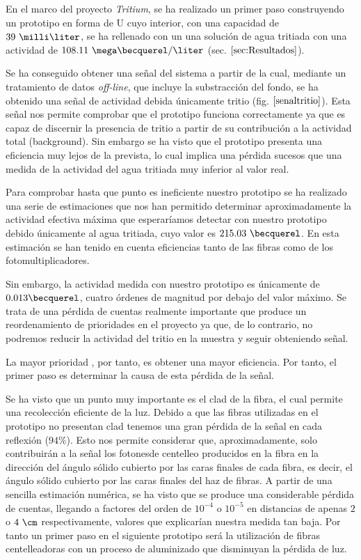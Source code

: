 En el marco del proyecto \textit{Tritium}, se ha realizado un primer paso construyendo un prototipo en forma de U cuyo interior, con una capacidad de $39~\milli\liter$, se ha rellenado con un una solución de agua tritiada con una actividad de $108.11~\mega\becquerel/\liter$ (sec. $\ref{sec:Resultados}$).

Se ha conseguido obtener una señal del sistema a partir de la cual, mediante un tratamiento de datos \textit{off-line}, que incluye la substracción del fondo, se ha obtenido una señal de actividad debida únicamente tritio (fig. $\ref{senaltritio}$). Esta señal nos permite comprobar que el prototipo funciona correctamente ya que es capaz de discernir la presencia de tritio a partir de su contribución a la actividad total (background).
Sin embargo se ha visto que el prototipo presenta una eficiencia muy lejos de la prevista, lo cual implica una pérdida sucesos que una medida de la actividad del agua tritiada muy inferior al valor real. 

Para comprobar hasta que punto es ineficiente nuestro prototipo se ha realizado una serie de estimaciones que nos han permitido determinar aproximadamente la actividad efectiva máxima que esperaríamos detectar con nuestro prototipo debido únicamente al agua tritiada, cuyo valor es $215.03~\becquerel$. En esta estimación se han tenido en cuenta eficiencias tanto de las fibras como de los fotomultiplicadores. 

Sin embargo, la actividad medida con nuestro prototipo es únicamente de $0.013\becquerel$, cuatro órdenes de magnitud por debajo del valor máximo. Se trata de una pérdida de cuentas realmente importante que produce un reordenamiento de prioridades en el proyecto ya que, de lo contrario, no podremos reducir la actividad del tritio en la muestra y seguir obteniendo señal. 

La mayor prioridad , por tanto, es obtener una mayor eficiencia. Por tanto, el primer paso es determinar la causa de  esta pérdida de la señal. 

Se ha visto que un punto muy importante es el clad de la fibra, el cual permite una recolección eficiente de la luz. Debido a que las fibras utilizadas en el prototipo no presentan clad tenemos una gran pérdida de la señal en cada reflexión ($94\%$). Esto nos permite considerar que, aproximadamente, solo contribuirán a la señal los fotonesde centelleo producidos en la fibra en la dirección del ángulo sólido cubierto por las caras finales de cada fibra, es decir, el ángulo sólido cubierto por las caras finales del haz de fibras. 
A partir de una sencilla estimación  numérica, se ha visto que se produce una considerable pérdida de cuentas, llegando a factores del orden de $10^{-4}$ o $10^{-5}$ en distancias de apenas $2$ o $4~\cm$ respectivamente, valores que explicarían nuestra medida tan baja. Por tanto un primer paso en el siguiente prototipo será la utilización de fibras centelleadoras con un proceso de aluminizado que disminuyan la pérdida de luz. 

